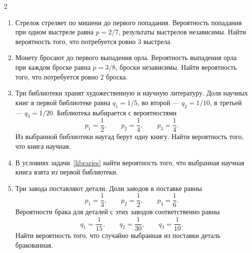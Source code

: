 \documentclass[a4paper,10pt]{article}
\begin{document}
\begin{multicols}{2}
\begin{enumerate}
\begin{minipage}[t]{\linewidth}
\end{minipage}

\item\begin{minipage}[t]{\linewidth} Стрелок стреляет по мишени до первого попадания. Вероятность попадания при одном выстреле равна $p=2/7$, результаты выстрелов независимы. Найти вероятность того, что потребуется ровно 3 выстрела.
\end{minipage}

\item\begin{minipage}[t]{\linewidth} Монету бросают до первого выпадения орла. Вероятность выпадения орла при каждом броске равна $p=3/8$, броски независимы. Найти вероятность того, что потребуется ровно 2 броска.

\end{minipage}

\item\begin{minipage}[t]{\linewidth}\label{libraries} Три библиотеки хранят художественную и научную литературу. Доля научных книг в первой библиотеке равна $q_1=1/5$, во второй --- $q_2=1/10$, в третьей --- $q_3=1/20$. Библиотека выбирается с вероятностями
\[
p_1=\frac12,\qquad p_2=\frac14,\qquad p_3=\frac14.
\]
Из выбранной библиотеки наугад берут одну книгу. Найти вероятность того, что книга научная.
\end{minipage}

\item\begin{minipage}[t]{\linewidth} В условиях задачи~\ref{libraries} найти вероятность того, что выбранная научная книга взята из первой библиотеки.

\end{minipage}

\item\begin{minipage}[t]{\linewidth}\label{factories} Три завода поставляют детали. Доли заводов в поставке равны
\[
p_1=\frac13,\qquad p_2=\frac12,\qquad p_3=\frac16.
\]
Вероятности брака для деталей с этих заводов соответственно равны
\[
q_1=\frac1{15},\qquad q_2=\frac1{30},\qquad q_3=\frac1{10}.
\]
Найти вероятность того, что случайно выбранная из поставки деталь бракованная.
\end{minipage}


\end{enumerate}
\end{multicols}
\end{document}
